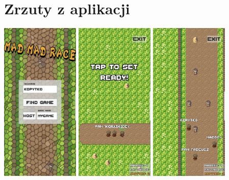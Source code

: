 \documentclass[]{report}
\begin{document}
\section*{Zrzuty z aplikacji}
\begin{center}
	\includegraphics[width=0.28\textwidth]{g1.jpg}
	\hfill
	\includegraphics[width=0.28\textwidth]{g3.jpg}
	\hfill
	\includegraphics[width=0.28\textwidth]{g2.jpg}
\end{center}
\end{document}
